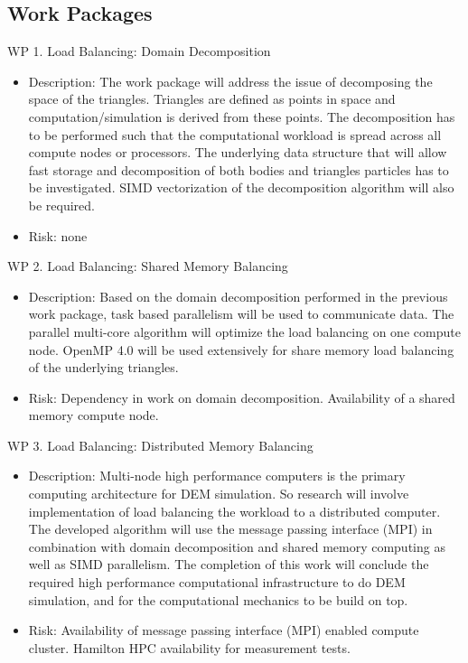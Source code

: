 \documentclass[times,12pt]{ACME2015article}
\begin{document}
\subsection{Work Packages}

WP 1. Load Balancing: Domain Decomposition
\begin{itemize}
\item Description: The work package will address the issue of decomposing the space of the triangles. Triangles are defined as points in space and computation/simulation is derived from these points. The decomposition has to be performed such that the computational workload is spread across all compute nodes or processors. The underlying data structure that will allow fast storage and decomposition of both bodies and triangles particles has to be investigated. SIMD vectorization of the decomposition algorithm will also be required.
\item Risk: none
\end{itemize}

\clearpage

WP 2. Load Balancing: Shared Memory Balancing 
\begin{itemize}
\item Description: Based on the domain decomposition performed in the previous work package, task based parallelism will be used to communicate data. The parallel multi-core algorithm will optimize the load balancing on one compute node. OpenMP 4.0 will be used extensively for share memory load balancing of the underlying triangles.
\item Risk: Dependency in work on domain decomposition. Availability of a shared memory compute node.
\end{itemize}

WP 3. Load Balancing: Distributed Memory Balancing 
\begin{itemize}
\item Description: Multi-node high performance computers is the primary computing architecture for DEM simulation. So research will involve implementation of load balancing the workload to a distributed computer. The developed algorithm will use the message passing interface (MPI) in combination with domain decomposition and shared memory computing as well as SIMD parallelism. The completion of this work will conclude the required high performance computational infrastructure to do DEM simulation, and for the computational mechanics to be build on top. 
\item Risk: Availability of message passing interface (MPI) enabled compute cluster. Hamilton HPC availability for measurement tests.
\end{itemize}
\end{document}

